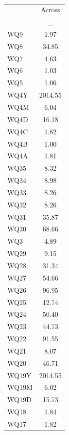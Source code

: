 \begin{table}[htbp]\centering
\def\sym#1{\ifmmode^{#1}\else\(^{#1}\)\fi}
\caption{ \label{}}
\begin{tabular}{l*{1}{c}}
\hline\hline
            &\multicolumn{1}{c}{Across}\\
            &           _\\
\hline
WQ9         &        1.97\\
WQ8         &       34.85\\
WQ7         &        4.63\\
WQ6         &        1.03\\
WQ5         &        1.06\\
WQ4Y        &     2014.55\\
WQ4M        &        6.04\\
WQ4D        &       16.18\\
WQ4C        &        1.82\\
WQ4B        &        1.00\\
WQ4A        &        1.81\\
WQ35        &        8.32\\
WQ34        &        8.98\\
WQ33        &        8.26\\
WQ32        &        8.26\\
WQ31        &       35.87\\
WQ30        &       68.66\\
WQ3         &        4.89\\
WQ29        &        9.15\\
WQ28        &       31.34\\
WQ27        &       54.66\\
WQ26        &       96.95\\
WQ25        &       12.74\\
WQ24        &       50.40\\
WQ23        &       44.73\\
WQ22        &       91.55\\
WQ21        &        8.07\\
WQ20        &       46.71\\
WQ19Y       &     2014.55\\
WQ19M       &        6.02\\
WQ19D       &       15.73\\
WQ18        &        1.84\\
WQ17        &        1.82\\

\end{tabular}
\end{table}

